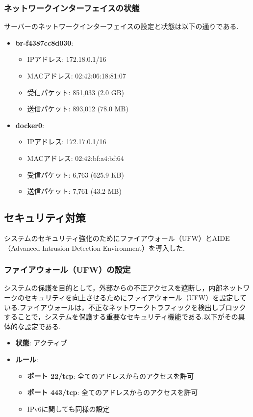 \documentclass[b5paper,12pt,dvipdfmx]{jsreport}
\begin{document}
\subsubsection{ネットワークインターフェイスの状態}
サーバーのネットワークインターフェイスの設定と状態は以下の通りである.
\begin{itemize}
    \item \textbf{br-f4387cc8d030}:
    \begin{itemize}
        \item IPアドレス: 172.18.0.1/16
        \item MACアドレス: 02:42:06:18:81:07
        \item 受信パケット: 851,033 (2.0 GB)
        \item 送信パケット: 893,012 (78.0 MB)
    \end{itemize}

    \item \textbf{docker0}:
    \begin{itemize}
        \item IPアドレス: 172.17.0.1/16
        \item MACアドレス: 02:42:bf:a4:bf:64
        \item 受信パケット: 6,763 (625.9 KB)
        \item 送信パケット: 7,761 (43.2 MB)
    \end{itemize}
\end{itemize}


\subsection{セキュリティ対策}

システムのセキュリティ強化のためにファイアウォール（UFW）とAIDE（Advanced Intrusion Detection Environment）を導入した.

\subsubsection{ファイアウォール（UFW）の設定}
システムの保護を目的として，外部からの不正アクセスを遮断し，内部ネットワークのセキュリティを向上させるためにファイアウォール（UFW）を設定している.ファイアウォールは，不正なネットワークトラフィックを検出しブロックすることで，システムを保護する重要なセキュリティ機能である.以下がその具体的な設定である.

\begin{itemize}
    \item \textbf{状態}: アクティブ
    \item \textbf{ルール}:
    \begin{itemize}
        \item \textbf{ポート 22/tcp}: 全てのアドレスからのアクセスを許可
        \item \textbf{ポート 443/tcp}: 全てのアドレスからのアクセスを許可
        \item IPv6に関しても同様の設定
    \end{itemize}
\end{itemize}
\end{document}
